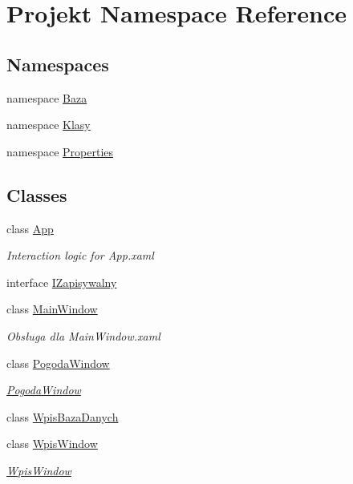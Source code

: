\hypertarget{namespace_projekt}{}\section{Projekt Namespace Reference}
\label{namespace_projekt}
\subsection*{Namespaces}
\begin{DoxyCompactItemize}
\item 
namespace \mbox{\hyperlink{namespace_projekt_1_1_baza}{Baza}}
\item 
namespace \mbox{\hyperlink{namespace_projekt_1_1_klasy}{Klasy}}
\item 
namespace \mbox{\hyperlink{namespace_projekt_1_1_properties}{Properties}}
\end{DoxyCompactItemize}
\subsection*{Classes}
\begin{DoxyCompactItemize}
\item 
class \mbox{\hyperlink{class_projekt_1_1_app}{App}}
\begin{DoxyCompactList}\small\item\em Interaction logic for App.\+xaml \end{DoxyCompactList}\item 
interface \mbox{\hyperlink{interface_projekt_1_1_i_zapisywalny}{I\+Zapisywalny}}
\item 
class \mbox{\hyperlink{class_projekt_1_1_main_window}{Main\+Window}}
\begin{DoxyCompactList}\small\item\em Obsługa dla Main\+Window.\+xaml \end{DoxyCompactList}\item 
class \mbox{\hyperlink{class_projekt_1_1_pogoda_window}{Pogoda\+Window}}
\begin{DoxyCompactList}\small\item\em \mbox{\hyperlink{class_projekt_1_1_pogoda_window}{Pogoda\+Window}} \end{DoxyCompactList}\item 
class \mbox{\hyperlink{class_projekt_1_1_wpis_baza_danych}{Wpis\+Baza\+Danych}}
\item 
class \mbox{\hyperlink{class_projekt_1_1_wpis_window}{Wpis\+Window}}
\begin{DoxyCompactList}\small\item\em \mbox{\hyperlink{class_projekt_1_1_wpis_window}{Wpis\+Window}} \end{DoxyCompactList}\end{DoxyCompactItemize}
